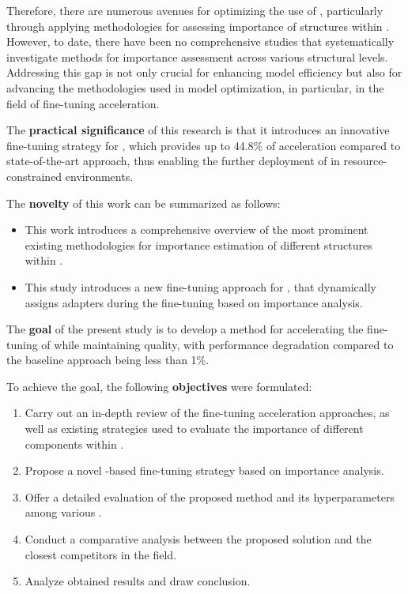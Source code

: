     Therefore, there are numerous avenues for optimizing the use of \llms{}, particularly through applying methodologies for assessing importance of structures within \llms{}. However, to date, there have been no comprehensive studies that systematically investigate methods for importance assessment across various structural levels. Addressing this gap is not only crucial for enhancing model efficiency but also for advancing the methodologies used in model optimization, in particular, in the field of fine-tuning acceleration. 

    The \textbf{practical significance} of this research is that it introduces an innovative fine-tuning strategy for \llms{}, which 
    provides up to 44.8\% of acceleration compared to state-of-the-art \lora{} approach, thus enabling the further deployment of \llms{} in resource-constrained environments.

    The \textbf{novelty} of this work can be summarized as follows:
    \begin{itemize}
        \item This work introduces a comprehensive overview of the most prominent existing methodologies for importance estimation of different structures within \llms{}. 
        \item This study introduces a new fine-tuning approach for \llms{}, that dynamically assigns \lora{} adapters during the fine-tuning based on importance analysis.
    \end{itemize}

    The \textbf{goal} of the present study is to develop a method for accelerating the fine-tuning of \llm{} while maintaining quality, with performance degradation compared to the baseline \lora{} approach being less than 1\%.

    To achieve the goal, the following \textbf{objectives} were formulated: 
    \begin{enumerate}
        \item Carry out an in-depth review of the fine-tuning acceleration approaches, as well as existing strategies used to evaluate the importance of different components within \llm{}. 
        \item Propose a novel \lora{}-based fine-tuning strategy based on importance analysis.
        \item Offer a detailed evaluation of the proposed method and its hyperparameters among various \llms{}.
        \item Conduct a comparative analysis between the proposed solution and the closest competitors in the field.  
        \item Analyze obtained results and draw conclusion.
    \end{enumerate}

